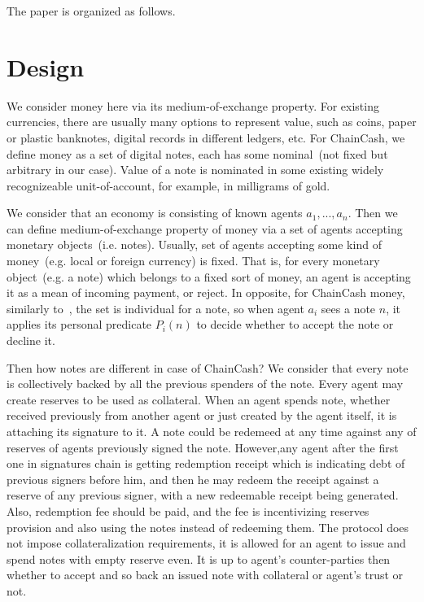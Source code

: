 \documentclass{article}   %
\newcommand{\cc}{ChainCash}
\begin{document}
The paper is organized as follows.

\section{Design}
\label{sec-design}

We consider money here via its medium-of-exchange property. For existing currencies, there are usually many options to represent value, such as coins, paper or plastic banknotes, digital records in different ledgers, etc. For \cc{}, we define money as a set of digital notes, each has some nominal~(not fixed but arbitrary in our case). Value of a note is nominated in some existing widely recognizeable unit-of-account, for example, in milligrams of gold.

We consider that an economy is consisting of known agents $a_1, ..., a_n$. Then we can define medium-of-exchange property of money via a set of agents accepting monetary objects~(i.e. notes). Usually, set of agents accepting some kind of money~(e.g. local or foreign currency) is fixed. That is, for every monetary object~(e.g. a note) which belongs to a fixed sort of money, an agent is accepting it as a mean of incoming payment, or reject. In opposite, for \cc{} money, similarly to~\cite{saito2003peer}, the set is individual for a note, so when agent $a_i$ sees a note $n$, it applies its personal predicate $P_i(n)$ to decide whether to accept the note or decline it.

Then how notes are different in case of \cc{}? We consider that every note is collectively backed by all the previous spenders of the note. Every agent may create reserves to be used as collateral. When an agent spends note, whether received previously from another agent or just created by the agent itself, it is attaching its signature to it. A note could be redemeed at any time against any of reserves of agents previously signed the note. However,any agent after the first one in signatures chain is getting redemption receipt which is indicating debt of previous signers before him, and then he may redeem the receipt against a reserve of any previous signer, with a new redeemable receipt being generated. Also, redemption fee should be paid, and the fee is incentivizing reserves provision and also using the notes instead of redeeming them. The protocol does not impose collateralization requirements, it is allowed for an agent to issue and spend notes with empty reserve even. It is up to agent's counter-parties then whether to accept and so back an issued note with collateral or agent's trust or not.
\end{document}
